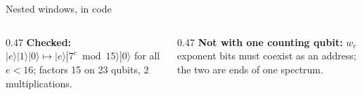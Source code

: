 \documentclass[aspectratio=169,11pt]{beamer}
\newcommand{\code}[2][]{}
\begin{document}
\begin{frame}[fragile]{Nested windows, in code}
  \code[basicstyle=\ttfamily\fontsize{7.6}{8.8}\selectfont]{nested.py}
  \begin{columns}[T]
    \begin{column}{0.47\textwidth}
      {\small\textbf{Checked:} $|e\rangle|1\rangle|0\rangle\mapsto|e\rangle|7^e\bmod15\rangle|0\rangle$ for all $e<16$; factors 15 on 23 qubits, 2 multiplications.}
    \end{column}
    \begin{column}{0.47\textwidth}
      {\small\textbf{Not with one counting qubit:} $w_e$ exponent bits must coexist as an address; the two are ends of one spectrum.}
    \end{column}
  \end{columns}
\end{frame}
\end{document}
